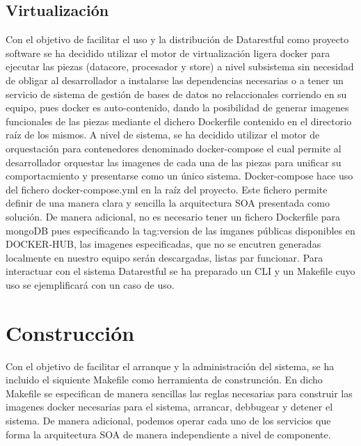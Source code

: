 \documentclass[a4paper,11pt]{book}
\begin{document}
\subsection{Virtualización}

Con el objetivo de facilitar el uso y la distribución de Datarestful como proyecto software se ha decidido utilizar el motor de virtualización ligera docker para ejecutar las piezas (datacore, procesador y store) a nivel subsistema sin necesidad de obligar al desarrollador a instalarse las dependencias necesarias o a tener un servicio de sistema de gestión de bases de datos no relaccionales corriendo en su equipo, pues docker es auto-contenido, dando la posibilidad de generar imagenes funcionales de las piezas mediante el dichero Dockerfile contenido en el directorio raíz de los mismos. A nivel de sistema, se ha decidido utilizar el motor de orquestación para contenedores denominado docker-compose el cual permite al desarrollador orquestar las imagenes de cada una de las piezas para unificar su comportacmiento y presentarse como un único sistema. Docker-compose hace uso del fichero docker-compose.yml en la raíz del proyecto. Este fichero permite definir de una manera clara y sencilla la arquitectura SOA presentada como solución. De manera adicional, no es necesario tener un fichero Dockerfile para mongoDB pues especificando la tag:version de las imganes públicas disponibles en DOCKER-HUB, las imagenes especificadas, que no se encutren generadas localmente en nuestro equipo serán descargadas, listas par funcionar. Para interactuar con el sistema Datarestful se ha preparado un CLI y un Makefile cuyo uso se ejemplificará con un caso de uso. 

\section{ Construcción }

Con el objetivo de facilitar el arranque y la administración del sistema, se ha incluido el siquiente Makefile como herramienta de construnción. En dicho Makefile se especifican de manera sencillas las reglas necesarias para construir las imagenes docker necesarias para el sistema, arrancar, debbugear y detener el sistema. De manera adicional, podemos operar cada uno de los servicios que forma la arquitectura SOA de manera independiente a nivel de componente. 
\end{document}
